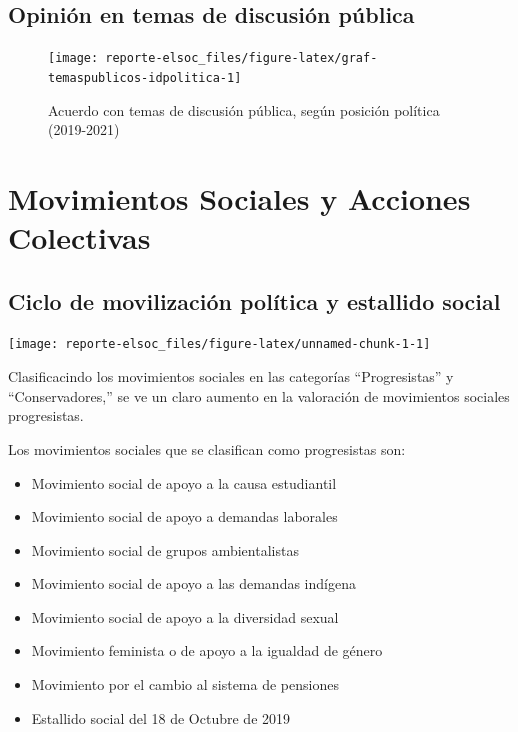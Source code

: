 \documentclass[
  12pt,
]{book}
\providecommand{\tightlist}{%
  \setlength{\itemsep}{0pt}\setlength{\parskip}{0pt}}
\begin{document}
\hypertarget{opiniuxf3n-en-temas-de-discusiuxf3n-puxfablica}{%
\subsection{Opinión en temas de discusión pública}\label{opiniuxf3n-en-temas-de-discusiuxf3n-puxfablica}}

\begin{figure}

{\centering \texttt{[image: reporte-elsoc\_files/figure-latex/graf-temaspublicos-idpolitica-1]} 

}

\caption{Acuerdo con temas de discusión pública, según posición política (2019-2021)}\label{fig:graf-temaspublicos-idpolitica}
\end{figure}

\hypertarget{movimientos-sociales-y-acciones-colectivas}{%
\section{Movimientos Sociales y Acciones Colectivas}\label{movimientos-sociales-y-acciones-colectivas}}

\hypertarget{ciclo-de-movilizaciuxf3n-poluxedtica-y-estallido-social}{%
\subsection{Ciclo de movilización política y estallido social}\label{ciclo-de-movilizaciuxf3n-poluxedtica-y-estallido-social}}

\begin{center}\texttt{[image: reporte-elsoc\_files/figure-latex/unnamed-chunk-1-1]} \end{center}

Clasificacindo los movimientos sociales en las categorías ``Progresistas'' y ``Conservadores,'' se ve un claro aumento en la valoración de movimientos sociales progresistas.

Los movimientos sociales que se clasifican como progresistas son:

\begin{itemize}
\tightlist
\item
  Movimiento social de apoyo a la causa estudiantil
\item
  Movimiento social de apoyo a demandas laborales
\item
  Movimiento social de grupos ambientalistas
\item
  Movimiento social de apoyo a las demandas indígena
\item
  Movimiento social de apoyo a la diversidad sexual
\item
  Movimiento feminista o de apoyo a la igualdad de género
\item
  Movimiento por el cambio al sistema de pensiones
\item
  Estallido social del 18 de Octubre de 2019
\end{itemize}
\end{document}

